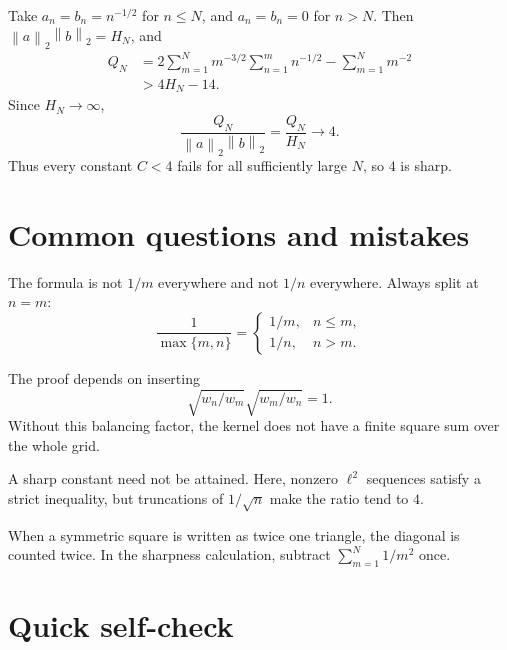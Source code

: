 \documentclass[11pt]{article}
\newcommand{\norm}[1]{\left\lVert #1\right\rVert}
\begin{document}
\begin{solutionBox}[Sharpness]
Take \(a_n=b_n=n^{-1/2}\) for \(n\leq N\), and \(a_n=b_n=0\) for \(n>N\). Then \(\norm a_2\norm b_2=H_N\), and
\[
\begin{aligned}
 Q_N
 &=2\sum_{m=1}^{N}m^{-3/2}\sum_{n=1}^{m}n^{-1/2}
   -\sum_{m=1}^{N}m^{-2}\\
 &>4H_N-14.
\end{aligned}
\]
Since \(H_N\to\infty\),
\[
  \frac{Q_N}{\norm a_2\norm b_2}
  =\frac{Q_N}{H_N}\longrightarrow4.
\]
Thus every constant \(C<4\) fails for all sufficiently large \(N\), so \(4\) is sharp.
\end{solutionBox}

\section{Common questions and mistakes}

\begin{warningBox}
The formula is not \(1/m\) everywhere and not \(1/n\) everywhere. Always split at \(n=m\):
\[
 \frac1{\max\{m,n\}}=
 \begin{cases}1/m,&n\leq m,\\1/n,&n>m.\end{cases}
\]
\end{warningBox}

\begin{warningBox}
The proof depends on inserting
\[
  \sqrt{w_n/w_m}\sqrt{w_m/w_n}=1.
\]
Without this balancing factor, the kernel does not have a finite square sum over the whole grid.
\end{warningBox}

\begin{warningBox}
A sharp constant need not be attained. Here, nonzero \(\ell^2\) sequences satisfy a strict inequality, but truncations of \(1/\sqrt n\) make the ratio tend to \(4\).
\end{warningBox}

\begin{warningBox}
When a symmetric square is written as twice one triangle, the diagonal is counted twice. In the sharpness calculation, subtract \(\sum_{m=1}^{N}1/m^2\) once.
\end{warningBox}

\section{Quick self-check}
\end{document}
